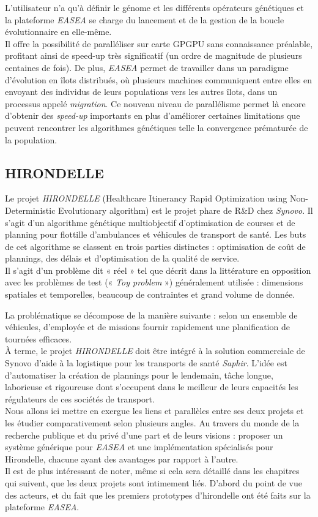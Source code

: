 \documentclass[french, 11pt]{memoir}
\begin{document}
\bigskip
L'utilisateur
n'a qu'à définir le génome et les différents opérateurs génétiques et la
plateforme \emph{EASEA} se charge du lancement et de la gestion de la
boucle évolutionnaire en elle-même. \\
Il offre la possibilité de
paralléliser sur carte GPGPU sans connaissance préalable, profitant
ainsi de speed-up très significatif (un ordre de magnitude de plusieurs
centaines de fois). De plus, \emph{EASEA} permet de travailler dans un
paradigme d'évolution en îlots distribués, où plusieurs machines
communiquent entre elles en envoyant des individus de leurs populations
vers les autres îlots, dans un processus appelé \emph{migration}. Ce
nouveau niveau de parallélisme permet là encore d'obtenir des \textit{speed-up}
importants en plus d'améliorer certaines limitations que peuvent
rencontrer les algorithmes génétiques telle la convergence prématurée de
la population.

\subsection{HIRONDELLE}\label{hirondelle}

Le projet \emph{HIRONDELLE} (Healthcare Itinerancy Rapid Optimization
using Non-Deterministic Evolutionary algorithm) est le projet phare de
R\&D chez \emph{Synovo}. Il s'agit d'un algorithme génétique
multiobjectif d'optimisation de courses et de planning pour flottille
d'ambulances et véhicules de transport de santé. Les buts de cet
algorithme se classent en trois parties distinctes : optimisation de
coût de plannings, des délais et d'optimisation de la qualité de
service. \\
Il s'agit d'un problème dit « réel » tel que décrit dans la
littérature en opposition avec les problèmes de test (« \emph{Toy
	problem} ») généralement utilisée : dimensions spatiales et temporelles,
beaucoup de contraintes et grand volume de donnée.

\bigskip
 La problématique se
décompose de la manière suivante : selon un ensemble de véhicules,
d'employée et de missions fournir rapidement une planification de
tournées efficaces. \\
À terme, le projet \emph{HIRONDELLE} doit être
intégré à la solution commerciale de Synovo d'aide à la logistique pour
les transports de santé \emph{Saphir}. L'idée est d'automatiser la
création de plannings pour le lendemain, tâche longue, laborieuse et
rigoureuse dont s'occupent dans le meilleur de leurs capacités les
régulateurs de ces sociétés de transport.
\\
Nous allons ici mettre en
exergue les liens et parallèles entre ses deux projets et les étudier
comparativement selon plusieurs angles. Au travers du monde de la
recherche publique et du privé d'une part et de leurs visions : proposer
un système générique pour \emph{EASEA} et une implémentation spécialisés
pour Hirondelle, chacune ayant des avantages par rapport à l'autre. \\
Il
est de plus intéressant de noter, même si cela sera détaillé dans les
chapitres qui suivent, que les deux projets sont intimement liés.
D'abord du point de vue des acteurs, et du fait que les premiers
prototypes d'hirondelle ont été faits sur la plateforme \emph{EASEA}.
\end{document}

